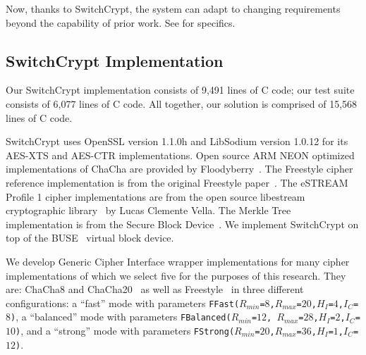 Now, thanks to SwitchCrypt, the system can adapt to changing requirements beyond
the capability of prior work. See  for specifics.

\subsection{SwitchCrypt Implementation} \label{subsec:implementation}

Our SwitchCrypt implementation consists of 9,491 lines of C code; our test suite
consists of 6,077 lines of C code. All together, our solution is comprised of
15,568 lines of C code.

SwitchCrypt uses OpenSSL version 1.1.0h and LibSodium version 1.0.12 for its
AES-XTS and AES-CTR implementations. Open source ARM NEON optimized
implementations of ChaCha are provided by Floodyberry~\cite{Floodyberry}. The
Freestyle cipher reference implementation is from the original Freestyle
paper~\cite{Freestyle}. The eSTREAM Profile 1 cipher implementations are from
the open source libestream cryptographic library~\cite{libestream} by Lucas
Clemente Vella. The Merkle Tree implementation is from the Secure Block
Device~\cite{SBD}. We implement SwitchCrypt on top of the BUSE~\cite{BUSE}
virtual block device.

We develop Generic Cipher Interface wrapper implementations for many
cipher implementations of which we select five for the purposes of
this research. They are: ChaCha8 and ChaCha20~\cite{ChaCha20} as well
as Freestyle~\cite{Freestyle} in three different configurations: a
``fast'' mode with parameters
\texttt{FFast($R_{min}$=$8$,$R_{max}$=$20$,$H_I$=$4$,$I_C$=$8$)}, a
``balanced'' mode with parameters \texttt{FBalanced($R_{min}$=$12$,
  $R_{max}$=$28$,$H_I$=$2$,$I_C$=$10$)}, and a ``strong'' mode with
parameters
\texttt{FStrong($R_{min}$=$20$,$R_{max}$=$36$,$H_I$=$1$,$I_C$=$12$)}.
